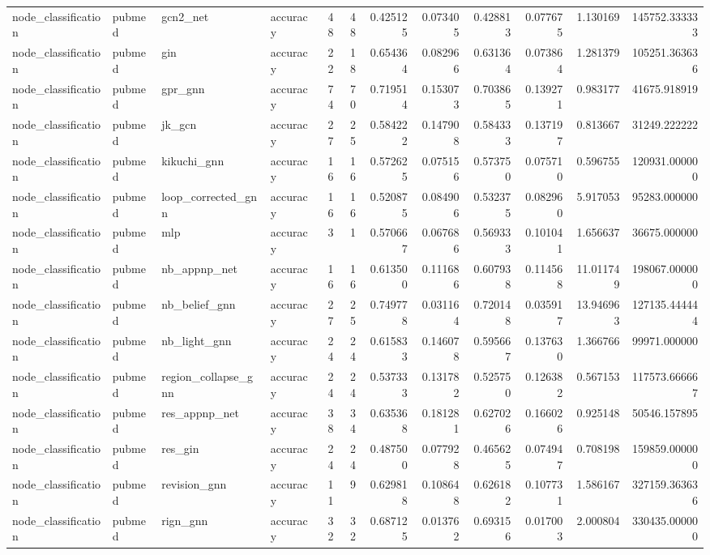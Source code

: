 \begin{tabular}{llllrrrrrrrr}
node_classification & pubmed & gcn2_net & accuracy & 48 & 48 & 0.425125 & 0.073405 & 0.428813 & 0.077675 & 1.130169 & 145752.333333 \\
node_classification & pubmed & gin & accuracy & 22 & 18 & 0.654364 & 0.082966 & 0.631364 & 0.073864 & 1.281379 & 105251.363636 \\
node_classification & pubmed & gpr_gnn & accuracy & 74 & 70 & 0.719514 & 0.153073 & 0.703865 & 0.139271 & 0.983177 & 41675.918919 \\
node_classification & pubmed & jk_gcn & accuracy & 27 & 25 & 0.584222 & 0.147908 & 0.584333 & 0.137197 & 0.813667 & 31249.222222 \\
node_classification & pubmed & kikuchi_gnn & accuracy & 16 & 16 & 0.572625 & 0.075156 & 0.573750 & 0.075710 & 0.596755 & 120931.000000 \\
node_classification & pubmed & loop_corrected_gnn & accuracy & 16 & 16 & 0.520875 & 0.084906 & 0.532375 & 0.082960 & 5.917053 & 95283.000000 \\
node_classification & pubmed & mlp & accuracy & 3 & 1 & 0.570667 & 0.067686 & 0.569333 & 0.101041 & 1.656637 & 36675.000000 \\
node_classification & pubmed & nb_appnp_net & accuracy & 16 & 16 & 0.613500 & 0.111686 & 0.607938 & 0.114568 & 11.011749 & 198067.000000 \\
node_classification & pubmed & nb_belief_gnn & accuracy & 27 & 25 & 0.749778 & 0.031164 & 0.720148 & 0.035917 & 13.946963 & 127135.444444 \\
node_classification & pubmed & nb_light_gnn & accuracy & 24 & 24 & 0.615833 & 0.146078 & 0.595667 & 0.137630 & 1.366766 & 99971.000000 \\
node_classification & pubmed & region_collapse_gnn & accuracy & 24 & 24 & 0.537333 & 0.131782 & 0.525750 & 0.126382 & 0.567153 & 117573.666667 \\
node_classification & pubmed & res_appnp_net & accuracy & 38 & 34 & 0.635368 & 0.181281 & 0.627026 & 0.166026 & 0.925148 & 50546.157895 \\
node_classification & pubmed & res_gin & accuracy & 24 & 24 & 0.487500 & 0.077928 & 0.465625 & 0.074947 & 0.708198 & 159859.000000 \\
node_classification & pubmed & revision_gnn & accuracy & 11 & 9 & 0.629818 & 0.108648 & 0.626182 & 0.107731 & 1.586167 & 327159.363636 \\
node_classification & pubmed & rign_gnn & accuracy & 32 & 32 & 0.687125 & 0.013762 & 0.693156 & 0.017003 & 2.000804 & 330435.000000 \\

\end{tabular}
